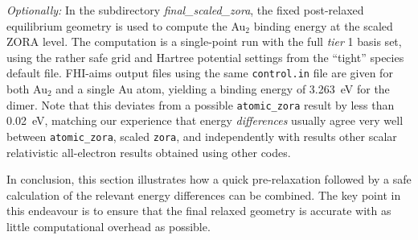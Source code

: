 \emph{Optionally:} In the subdirectory \emph{final\_scaled\_zora}, the
fixed post-relaxed 
equilibrium geometry is used to compute the Au$_2$ binding energy at the
scaled ZORA level.  The computation is a single-point run with
the full \emph{tier} 1 basis set, using the rather safe grid and
Hartree potential settings from the ``tight'' species default
file. FHI-aims output files using the same \texttt{control.in} file
are given for both Au$_2$ and a single Au atom, yielding a binding
energy of 3.263~eV for the dimer. Note that this deviates from a possible
\texttt{atomic\_zora} result by less than 0.02~eV, matching our experience
that energy \emph{differences} usually agree very well between
\texttt{atomic\_zora}, scaled \texttt{zora}, and independently with results
other scalar relativistic all-electron results obtained using other
codes. 

In conclusion, this section illustrates how a quick pre-relaxation followed 
by a safe calculation of the relevant energy differences can be
combined. The key point in this endeavour is to ensure that the final 
relaxed geometry is accurate with as little computational overhead as
possible. 
